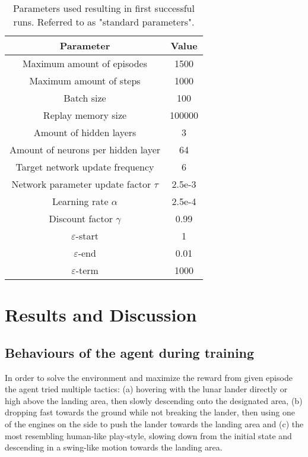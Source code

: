 \documentclass{article}
\begin{document}
\begin{table}[ht]
    \caption{Parameters used resulting in first successful runs. Referred to as "standard parameters".}
    \vspace{0.5cm}
    \label{table:standard}
    \centering
    \begin{tabular}{cc}
        \hline
        \textbf{Parameter}                      & \textbf{Value} \\
        \hline
        Maximum amount of episodes              & 1500      \\
        Maximum amount of steps                 & 1000      \\
        Batch size                              & 100       \\
        Replay memory size                      & 100000    \\
        Amount of hidden layers                 & 3         \\
        Amount of neurons per hidden layer      & 64        \\
        Target network update frequency         & 6         \\
        Network parameter update factor $\tau$  & 2.5e-3    \\
        Learning rate $\alpha$                  & 2.5e-4    \\
        Discount factor $\gamma$                & 0.99      \\
        $\varepsilon$-start                     & 1         \\
        $\varepsilon$-end                       & 0.01      \\
        $\varepsilon$-term                      & 1000      \\
        \hline
    \end{tabular}
\end{table}


\newpage
\section{Results and Discussion}

\subsection*{Behaviours of the agent during training}
In order to solve the environment and maximize the reward from given episode the agent tried multiple tactics: (a) hovering with the lunar lander directly or high above the landing area, then slowly descending onto the designated area, (b) dropping fast towards the ground while not breaking the lander, then using one of the engines on the side to push the lander towards the landing area and (c) the most resembling human-like play-style, slowing down from the initial state and descending in a swing-like motion towards the landing area.
\end{document}
